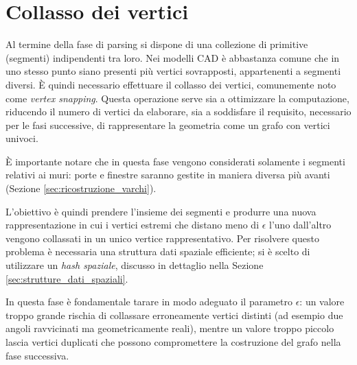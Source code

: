 \newpage
\section{Collasso dei vertici}
\label{sec:collasso_dei_vertici}

Al termine della fase di parsing si dispone di una collezione di primitive (segmenti) indipendenti tra loro. Nei modelli CAD è abbastanza comune che in uno stesso punto siano presenti più vertici sovrapposti, appartenenti a segmenti diversi. È quindi necessario effettuare il collasso dei vertici, comunemente noto come \emph{vertex snapping}. Questa operazione serve sia a ottimizzare la computazione, riducendo il numero di vertici da elaborare, sia a soddisfare il requisito, necessario per le fasi successive, di rappresentare la geometria come un grafo con vertici univoci.

È importante notare che in questa fase vengono considerati solamente i segmenti relativi ai muri: porte e finestre saranno gestite in maniera diversa più avanti (Sezione \ref{sec:ricostruzione_varchi}).

L'obiettivo è quindi prendere l'insieme dei segmenti e produrre una nuova rappresentazione in cui i vertici estremi che distano meno di $\epsilon$ l'uno dall'altro vengono collassati in un unico vertice rappresentativo. Per risolvere questo problema è necessaria una struttura dati spaziale efficiente; si è scelto di utilizzare un \emph{hash spaziale}, discusso in dettaglio nella Sezione \ref{sec:strutture_dati_spaziali}.

In questa fase è fondamentale tarare in modo adeguato il parametro $\epsilon$: un valore troppo grande rischia di collassare erroneamente vertici distinti (ad esempio due angoli ravvicinati ma geometricamente reali), mentre un valore troppo piccolo lascia vertici duplicati che possono compromettere la costruzione del grafo nella fase successiva.

